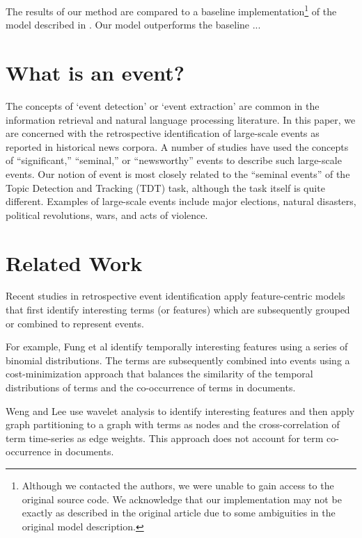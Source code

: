 \documentclass{sig-alternate}
\begin{document}
The results of our method are compared to a baseline implementation\footnote{Although we contacted the authors, we were unable to gain access to the original source code. We acknowledge that our implementation may not be exactly as described in the original article due to some ambiguities in the original model description.} of the model described in \cite{He2007}. Our model outperforms the baseline ...


\section{What is an event?}

The concepts of `event detection' or `event extraction' are common in the information retrieval and natural language processing literature. In this paper, we are concerned with the retrospective identification of large-scale events as reported in historical news corpora. A number of studies have used the concepts of ``significant,'' ``seminal,'' or ``newsworthy'' events to describe such large-scale events.  Our notion of event is most closely related to the ``seminal events'' of the Topic Detection and Tracking (TDT) task, although the task itself is quite different. Examples of large-scale events include major elections, natural disasters, political revolutions, wars, and acts of violence.


\section{Related Work}

Recent studies in retrospective event identification apply feature-centric models \cite{Yi, Fung2005, Chen2009, Teng2008, Weng2011} that first identify interesting terms (or features) which are subsequently grouped or combined to represent events. 

For example, Fung et al \cite{Fung2005} identify temporally interesting features using a series of binomial distributions. The terms are subsequently combined  into events using a cost-minimization approach that balances the similarity of the temporal distributions of terms and the co-occurrence of terms in documents. 

Weng and Lee \cite{Weng2011} use wavelet analysis to identify interesting features and then apply graph partitioning to a graph with terms as nodes and the cross-correlation of term time-series as edge weights. This approach does not account for term co-occurrence in documents.
\end{document}

